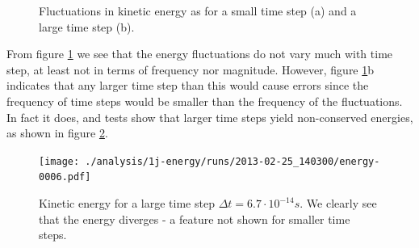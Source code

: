 \documentclass[reprint,floatfix,amsmath,amssymb,aps,pra]{revtex4-1}
\begin{document}
\begin{figure}
    \centering
     \label{fig:energy-fluctuations-small}
     \label{fig:energy-fluctuations-large}
    \caption{Fluctuations in kinetic energy as for a small time step (a) and a large time step (b).}
    \label{fig:energy-fluctuations}
\end{figure}

From figure \ref{fig:energy-fluctuations} we see that the energy fluctuations do not vary much with time step, at least not in terms of frequency nor magnitude. However, figure \ref{fig:energy-fluctuations}b indicates that any larger time step than this would cause errors since the frequency of time steps would be smaller than the frequency of the fluctuations. In fact it does, and tests show that larger time steps yield non-conserved energies, as shown in figure \ref{fig:energy-fluctuations-larger}.

\begin{figure}
  \centering
  \texttt{[image: ./analysis/1j-energy/runs/2013-02-25\_140300/energy-0006.pdf]}
  \caption{Kinetic energy for a large time step $\Delta t = 6.7 \cdot 10^{-14} \unit{s}$. We clearly see that the energy diverges - a feature not shown for smaller time steps.}
  \label{fig:energy-fluctuations-larger}
\end{figure}
\end{document}
